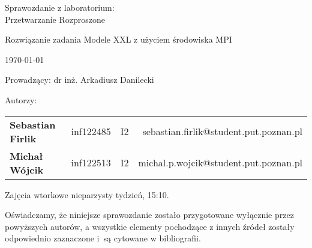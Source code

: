 \thispagestyle{empty} %

\begin{center}
{\large{Sprawozdanie z laboratorium:\\
Przetwarzanie Rozproszone}}

\vspace{3ex}

Rozwiązanie zadania Modele XXL z użyciem środowiska MPI


\vspace{3ex}
{\footnotesize\today}

\end{center}


\vspace{10ex}

Prowadzący: dr inż. Arkadiusz Danilecki

\vspace{5ex}

Autorzy:
\begin{tabular}{lllr}
\textbf{Sebastian Firlik} & inf122485 & I2 & sebastian.firlik@student.put.poznan.pl \\
\textbf{Michał Wójcik} & inf122513 & I2 & michal.p.wojcik@student.put.poznan.pl \\
\end{tabular}

\vspace{5ex}

Zajęcia wtorkowe nieparzysty tydzień, 15:10.

\vspace{35ex}

\noindent Oświadczamy, że niniejsze sprawozdanie zostało przygotowane wyłącznie przez powyższych autorów,
a wszystkie elementy pochodzące z innych źródeł zostały odpowiednio zaznaczone i~są cytowane w bibliografii.  

\newpage

